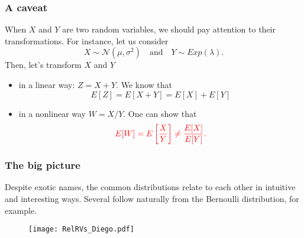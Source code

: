 \documentclass[notes=show,smaller,handout]{beamer}\usepackage[]{graphicx}\usepackage[]{color}
\begin{document}
\begin{frame}
\frametitle{A caveat }

When $X$ and $Y$ are two random variables, we should pay attention to their transformations. For instance, let us consider
$$
X\sim \mathcal{N}(\mu,\sigma^2) \quad \text{and}  \quad Y\sim Exp(\lambda).
$$
Then, let's transform $X$ and $Y$

\begin{itemize}
\item  in a linear way: $Z=X+Y$. We know that
$$
E[Z] = E[X+Y] = E[X] + E[Y]
$$
\item in a nonlinear way $W = X/Y$. One can show that
$$\color{red}
E[W] = E\left[\frac{X}{Y}\right] \neq \frac{E[X]}{E[Y]}. \color{black}
$$
 \end{itemize}
\end{frame}

\begin{frame}
\frametitle{The big picture}

Despite exotic names, the common distributions relate to each other in intuitive and interesting ways. Several follow naturally from the Bernoulli distribution, for example.

\begin{figure}[ptb]\centering
\texttt{[image: RelRVs\_Diego.pdf]}%
\end{figure}%

\end{frame}
\end{document}
